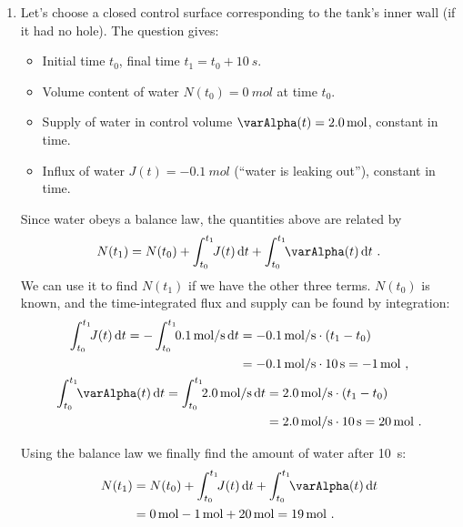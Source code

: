 \documentclass[a4paper,12pt,%
onecolumn,oneside,%
british%
]{memoir}
\newcommand*{\di}{\mathrm{d}}%
\renewcommand*{\|}[1][]{\nonscript\:#1\vert\nonscript\:\mathopen{}}
\newcommand*{\yti}{t_{0}}
\newcommand*{\ytf}{t_{1}}
\newcommand*{\yN}{N}
\newcommand*{\yJ}{J}
\newcommand*{\ya}{\varAlpha}
\begin{document}
\begin{enumerate}[exerc]
\item Let's choose a closed control surface corresponding to the tank's inner wall (if it had no hole). The question gives:
  \begin{itemize}[nosep]
  \item Initial time $\yti$, final time $\ytf= \yti + \qty{10}{s}$.
  \item Volume content of water $\yN(\yti)=\qty{0}{mol}$ at time $\yti$.
  \item Supply of water in control volume $\ya(t) = \qty{2.0}{mol}$, constant in time.
  \item Influx of water $\yJ(t) = -\qty{0.1}{mol}$ (\enquote{water is leaking out}), constant in time.
  \end{itemize}

  Since water obeys a balance law, the quantities above are related by
  \begin{equation*}
    \yN(\ytf) = \yN(\yti) + \int_{\yti}^{\ytf}\!\!\yJ(t)\, \di t
    + \int_{\yti}^{\ytf}\!\!\ya(t)\, \di t \ .
  \end{equation*}
We can use it to find $\yN(\ytf)$ if we have the other three terms. $\yN(\yti)$ is known, and the time-integrated flux and supply can be found by integration:
\begin{equation*}
  \begin{gathered}
    \begin{aligned}
      \int_{\yti}^{\ytf}\!\!\yJ(t)\, \di t =
      -\int_{\yti}^{\ytf}\!\!\qty{0.1}{mol/s}\, \di t
      &= -\qty{0.1}{mol/s}\cdot (\ytf-\yti)
      \\&= -\qty{0.1}{mol/s} \cdot \qty{10}{s} = -\qty{1}{mol} \ ,
    \end{aligned}
    \\
    \begin{aligned}
      \int_{\yti}^{\ytf}\!\!\ya(t)\, \di t =
      \int_{\yti}^{\ytf}\!\!\qty{2.0}{mol/s}\, \di t
      &= \qty{2.0}{mol/s}\cdot (\ytf-\yti)
      \\&=\qty{2.0}{mol/s} \cdot \qty{10}{s} = \qty{20}{mol} \ .
    \end{aligned}
  \end{gathered}
\end{equation*}

Using the balance law we finally find the amount of water after \qty{10}{s}:
  \begin{equation*}
    \begin{split}
      \yN(\ytf) &= \yN(\yti) + \int_{\yti}^{\ytf}\!\!\yJ(t)\, \di t
      + \int_{\yti}^{\ytf}\!\!\ya(t)\, \di t
      \\&= \qty{0}{\mol} -\qty{1}{mol} + \qty{20}{mol}
      = \qty{19}{mol} \ .
    \end{split}
  \end{equation*}


\end{enumerate}
\end{document}

